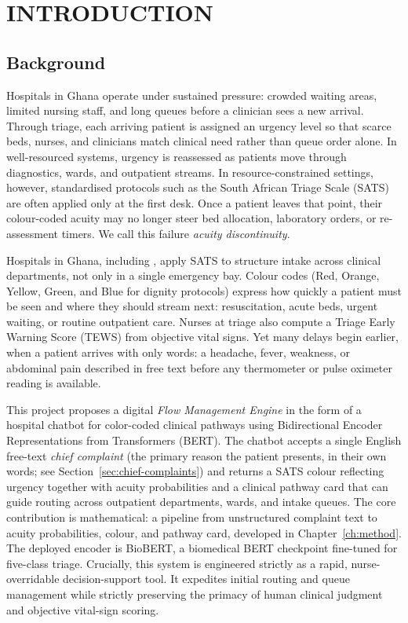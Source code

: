 \chapter{INTRODUCTION}
\label{ch:intro}

\section{Background}

Hospitals in Ghana operate under sustained pressure: crowded waiting areas, limited nursing staff, and long queues before a clinician sees a new arrival. Through triage, each arriving patient is assigned an urgency level so that scarce beds, nurses, and clinicians match clinical need rather than queue order alone. In well-resourced systems, urgency is reassessed as patients move through diagnostics, wards, and outpatient streams. In resource-constrained settings, however, standardised protocols such as the South African Triage Scale (SATS) are often applied only at the first desk. Once a patient leaves that point, their colour-coded acuity may no longer steer bed allocation, laboratory orders, or re-assessment timers. We call this failure \emph{acuity discontinuity}.

Hospitals in Ghana, including \examplehospital{}, apply SATS to structure intake across clinical departments, not only in a single emergency bay. Colour codes (Red, Orange, Yellow, Green, and Blue for dignity protocols) express how quickly a patient must be seen and where they should stream next: resuscitation, acute beds, urgent waiting, or routine outpatient care. Nurses at triage also compute a Triage Early Warning Score (TEWS) from objective vital signs. Yet many delays begin earlier, when a patient arrives with only words: a headache, fever, weakness, or abdominal pain described in free text before any thermometer or pulse oximeter reading is available.

This project proposes a digital \emph{Flow Management Engine} in the form of a hospital chatbot for color-coded clinical pathways using Bidirectional Encoder Representations from Transformers (BERT). The chatbot accepts a single English free-text \emph{chief complaint} (the primary reason the patient presents, in their own words; see Section~\ref{sec:chief-complaints}) and returns a SATS colour reflecting urgency together with acuity probabilities and a clinical pathway card that can guide routing across outpatient departments, wards, and intake queues. The core contribution is mathematical: a pipeline from unstructured complaint text to acuity probabilities, colour, and pathway card, developed in Chapter~\ref{ch:method}. The deployed encoder is BioBERT, a biomedical BERT checkpoint fine-tuned for five-class triage. Crucially, this system is engineered strictly as a rapid, nurse-overridable decision-support tool. It expedites initial routing and queue management while strictly preserving the primacy of human clinical judgment and objective vital-sign scoring.

